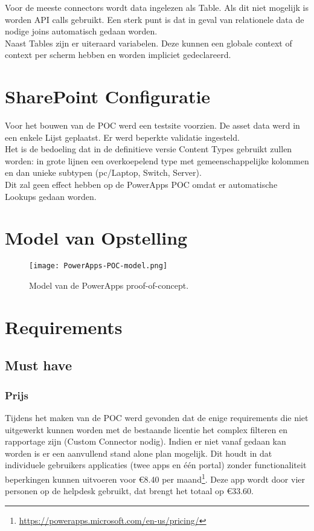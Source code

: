 Voor de meeste connectors wordt data ingelezen als Table. Als dit niet mogelijk is worden API calls gebruikt. Een sterk punt is dat in geval van relationele data de nodige joins automatisch gedaan worden. \autocite{Lindhorst2018}\\
Naast Tables zijn er uiteraard variabelen. Deze kunnen een globale context of context per scherm hebben en worden impliciet gedeclareerd.

\section{SharePoint Configuratie}
\label{sec:sharepoint}


Voor het bouwen van de POC werd een testsite voorzien. De asset data werd in een enkele Lijst geplaatst. Er werd beperkte validatie ingesteld.\\
Het is de bedoeling dat in de definitieve versie Content Types gebruikt zullen worden: in grote lijnen een overkoepelend type met gemeenschappelijke kolommen en dan unieke subtypen (pc/Laptop, Switch, Server). \\
Dit zal geen effect hebben op de PowerApps POC omdat er automatische Lookups gedaan worden.

\section{Model van Opstelling}

\begin{figure}[h!]
    \centering
    \texttt{[image: PowerApps-POC-model.png]}
    \caption{Model van de PowerApps proof-of-concept.}
    \label{fig:PowerApps-POC-model}
\end{figure}

\section{Requirements}

\subsection{Must have}

\subsubsection{Prijs}

Tijdens het maken van de POC werd gevonden dat de enige requirements die niet uitgewerkt kunnen worden met de bestaande licentie het complex filteren en rapportage zijn (Custom Connector nodig). Indien er niet vanaf gedaan kan worden is er een aanvullend stand alone plan mogelijk. Dit houdt in dat individuele gebruikers applicaties (twee apps en één portal) zonder functionaliteit beperkingen kunnen uitvoeren voor \euro 8.40 per maand\footnote{\url{https://powerapps.microsoft.com/en-us/pricing/}}. Deze app wordt door vier personen op de helpdesk gebruikt, dat brengt het totaal op \euro 33.60.

